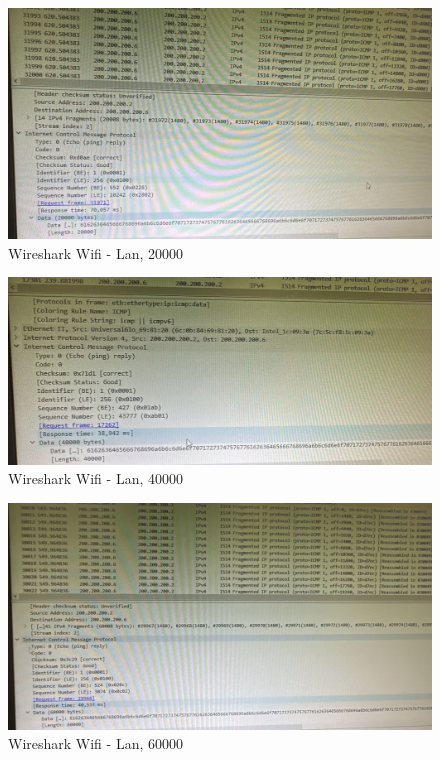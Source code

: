 
\begin{figure}[H]
    \centering
    \includegraphics[width=\columnwidth]{punto1/p1_ws_wifi_lan_20k.jpeg}
    \caption{Wireshark Wifi - Lan, 20000}
    \label{fig:ws_wifi_lan_20k}
\end{figure}

\begin{figure}[H]
    \centering
    \includegraphics[width=\columnwidth]{punto1/p1_ws_wifi_lan_40k.jpeg}
    \caption{Wireshark Wifi - Lan, 40000}
    \label{fig:ws_wifi_lan_40k}
\end{figure}

\begin{figure}[H]
    \centering
    \includegraphics[width=\columnwidth]{punto1/p1_ws_wifi_lan_60k.jpeg}
    \caption{Wireshark Wifi - Lan, 60000}
    \label{fig:ws_wifi_lan_6k}
\end{figure}

